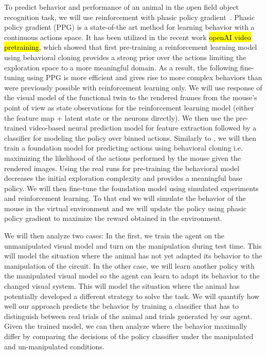 \documentclass[B2,COG]{ercgrant}
\begin{document}
To predict behavior and performance of an animal in the open field object recognition task, we will use reinforcement with phasic policy gradient~\parencite[PPG,][]{Cobbe2021-op}. 
Phasic policy gradient (PPG) is a state-of-the art method for learning behavior with a continuous actions space. 
It has been utilized in the recent work \hl{openAI video pretraining}, which showed that first pre-training a reinforcement learning model using behavioral cloning provides a strong prior over the actions limiting the exploration space to a more meaningful domain. 
As a result, the following fine-tuning using PPG is more efficient and gives rise to more complex behaviors than were previously possible with reinforcement learning only.
We will use response of the visual model of the functional twin to the rendered frames from the mouse's point of view as state observations for the reinforcement learning model (either the feature map + latent state or the neurons directly). 
We then use the pre-trained video-based neural prediction model for feature extraction followed by a classifier for modeling the policy over binned actions.
Similarly to \cite{Baker2022-ph}, we will then train a foundation model for predicting actions using behavioral cloning i.e. maximizing the likelihood of the actions performed by the mouse given the rendered images.
Using the real runs for pre-training the behavioral model decreases the initial exploration complexity and provides a meaningful base policy.
We will then fine-tune the foundation model using simulated experiments and reinforcement learning. 
To that end we will simulate the behavior of the mouse in the virtual environment and we will update the policy using phasic policy gradient \parencite{Cobbe2021-op} to maximize the reward obtained in the environment.

We will then analyze two cases: In the first, we train the agent on the unmanipulated visual model and turn on the manipulation during test time. 
This will model the situation where the animal has not yet adapted its behavior to the manipulation of the circuit. 
In the other case, we will learn another policy with the manipulated visual model so the agent can learn to adapt its behavior to the changed visual system. 
This will model the situation where the animal has potentially developed a different strategy to solve the task. 
We will quantify how well our approach predicts the behavior by training a classifier that has to distinguish between real trials of the animal and trials generated by our agent. 
Given the trained model, we can then analyze where the behavior maximally differ by comparing the decisions of the policy classifier under the manipulated and un-manipulated conditions. 
\end{document}
